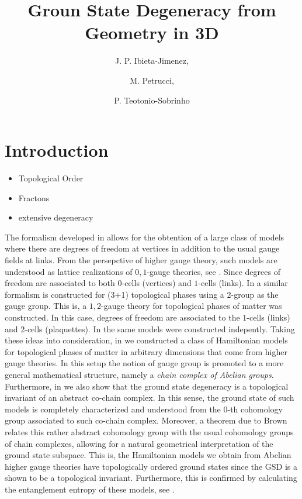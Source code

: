 \documentclass[a4paper,11pt]{article}
\title{\textbf{Groun State Degeneracy from Geometry in 3D}}
\author[a,1]{J. P. Ibieta-Jimenez,\note{Corresponding author.}}
\author[a]{M. Petrucci,}
\author[a]{P. Teotonio-Sobrinho}
\affiliation[a]{Departamento de F\'isica Matem\'atica, Universidade de S\~ao Paulo\\ Rua do Mat\~ao Travessa R 187, CEP 05508-090, S\~ao Paulo, Brazil.}
\theoremstyle{plain}%
\theoremstyle{definition}
\theoremstyle{remark}
\begin{document}
 
\maketitle
\flushbottom

\section{Introduction}
\label{sec:intro}
\begin{itemize}
\item Topological Order
\item Fractons
\item extensive degeneracy
\end{itemize}
The formalism developed in \cite{Matter} allows for the obtention of a large class of models where there are degrees of freedom at vertices in addition to the usual gauge fields at links. From the persepctive of higher gauge theory, such models are understood as lattice realizations of $0,1$-gauge theories, see \cite{higher, higher-ent}. Since degrees of freedom are associated to both $0$-cells (vertices) and $1$-cells (links). In \cite{kazuophd,ricardomsc} a similar formalism is constructed for (3+1) topological phases using a $2$-group as the gauge group. This is, a $1,2$-gauge theory for topological phases of matter was constructed. In this case, degrees of freedom are associated to the $1$-cells (links) and $2$-cells (plaquettes). In \cite{Bullivant16, Bullivant17} the same models were constructed indepently. Taking these ideas into consideration, in \cite{higher} we constructed a class of Hamiltonian models for topological phases of matter in arbitrary dimensions that come from higher gauge theories. In this setup the notion of gauge group is promoted to a more general mathematical structure, namely a \textit{chain complex of Abelian groups}. Furthermore, in \cite{higher} we also show that the ground state degeneracy is a topological invariant of an abstract co-chain complex. In this sense, the ground state of such models is completely characterized and understood from the $0$-th cohomology group associated to such co-chain complex. Moreover, a theorem due to Brown \cite{Brown} relates this rather abstract cohomology group with the usual cohomology groups of chain complexes, allowing for a natural geometrical interpretation of the ground state subspace. This is, the Hamiltonian models we obtain from Abelian higher gauge theories have topologically ordered ground states since the GSD is a shown to be a topological invariant. Furthermore, this is confirmed by calculating the entanglement entropy of these models, see \cite{higher-ent}.
\end{document}
